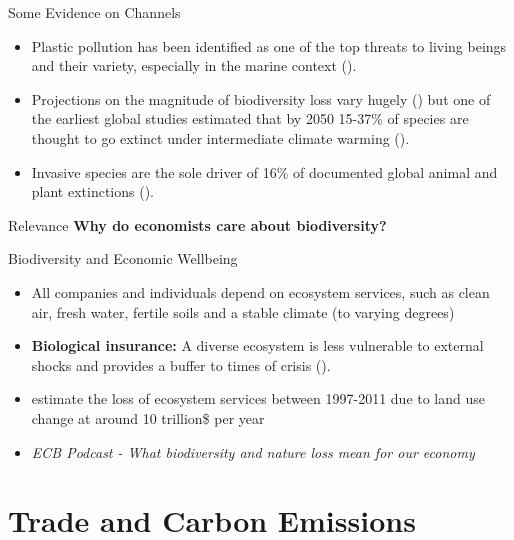 \documentclass{beamer}
\begin{document}
\begin{frame}{Some Evidence on Channels}
    \begin{itemize} \small
        \item Plastic pollution has been identified as one of the top threats to living beings and their variety, especially in the marine context (\cite{marine_biodiversity}). %
        \item Projections on the magnitude of biodiversity loss vary hugely (\cite{biodiversity_review}) but one of the earliest global studies estimated that by 2050 15-37\% of species are thought to go extinct under intermediate climate warming (\cite{thomas_extinction_2004}).
        \item Invasive species are the sole driver of 16\% of documented global animal and plant extinctions (\cite{ipbes2023invasive}).
    \end{itemize}
\end{frame}

\begin{frame}{Relevance}
    \Large \textbf{Why do economists care about biodiversity?}
\end{frame}

\begin{frame}{Biodiversity and Economic Wellbeing}
    \begin{itemize} \small
    \item All companies and individuals depend on ecosystem services, such as clean air, fresh water, fertile soils and a stable climate (to varying degrees)
        \item \textbf{Biological insurance:} A diverse ecosystem is less vulnerable to external shocks and provides a buffer to times of crisis (\cite{Loreau2021}).
        \item \textcite{COSTANZA_ecosystem_services} estimate the loss of ecosystem services between 1997-2011 due to land use change at around 10 trillion\$ per year
       \item[\href{https://www.youtube.com/watch?v=DP3tRzELPLY}{\textcolor{deepblue}{\underline{Link:}}}] \textit{\footnotesize ECB Podcast - What biodiversity and nature loss mean for our economy} 
    \end{itemize}
\end{frame}

\section{Trade and Carbon Emissions}
\end{document}
